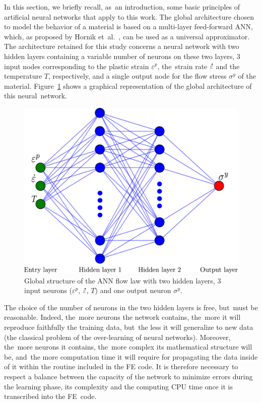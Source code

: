\documentclass[algorithms,article,accept,pdftex,oneauthors]{Definitions/mdpi}
\DeclareRobustCommand{\mdot}[1]{\accentset{\mbox{\bfseries .}}{#1}}
\begin{document}
In this section, we briefly recall, as~an introduction, some basic principles of artificial neural networks that apply to this work.
The global architecture chosen to model the behavior of a material is based on a multi-layer feed-forward ANN, which, as proposed by Hornik et~al.~\cite{Hornik-1989}, can be used as a universal approximator.
The architecture retained for this study concerns a neural network with two hidden layers containing a variable number of neurons on these two layers, $3$ input nodes corresponding to the plastic strain $\varepsilon^p$, the~strain rate $\mdot\varepsilon$ and the temperature $T$, respectively, and a single output node for the flow stress $\sigma^y$ of the material.
Figure~\ref{fig:ANN-scheme} shows a graphical representation of the global architecture of this neural~network.
\begin{figure}[H]
\includegraphics[width=0.65\columnwidth]{Figures/ANN-scheme-2HL}
\caption{Global structure of the ANN flow law with two hidden layers, 3 input neurons ($\varepsilon^p$, $\mdot\varepsilon$, $T$) and one output neuron $\sigma^y$.}
\label{fig:ANN-scheme}
\end{figure}
The choice of the number of neurons in the two hidden layers is free, but~must be reasonable.
Indeed, the~more neurons the network contains, the~more it will reproduce faithfully the training data, but~the less it will generalize to new data (the classical problem of the over-learning of neural networks).
Moreover, the~more neurons it contains, the~more complex its mathematical structure will be, and~the more computation time it will require for propagating the data inside of it within the routine included in the FE code.
It is therefore necessary to respect a balance between the capacity of the network to minimize errors during the learning phase, its complexity and the computing CPU time once it is transcribed into the FE~code.
\end{document}
